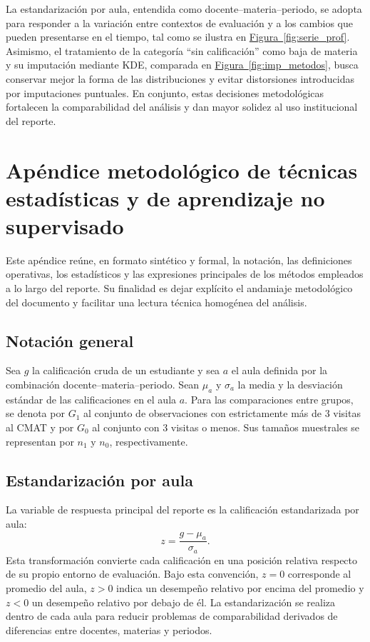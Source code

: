 \documentclass[8pt,a4paper]{article} %
\numberwithin{figure}{subsection}
\begin{document}
La estandarización por aula, entendida como docente--materia--periodo, se adopta para responder a la variación entre contextos de evaluación y a los cambios que pueden presentarse en el tiempo, tal como se ilustra en \hyperref[fig:serie_prof]{Figura~\ref{fig:serie_prof}}. Asimismo, el tratamiento de la categoría ``sin calificación'' como baja de materia y su imputación mediante KDE, comparada en \hyperref[fig:imp_metodos]{Figura~\ref{fig:imp_metodos}}, busca conservar mejor la forma de las distribuciones y evitar distorsiones introducidas por imputaciones puntuales. En conjunto, estas decisiones metodológicas fortalecen la comparabilidad del análisis y dan mayor solidez al uso institucional del reporte.

\appendix
\newpage
\section{Apéndice metodológico de técnicas estadísticas y de aprendizaje no supervisado}

Este apéndice reúne, en formato sintético y formal, la notación, las definiciones operativas, los estadísticos y las expresiones principales de los métodos empleados a lo largo del reporte. Su finalidad es dejar explícito el andamiaje metodológico del documento y facilitar una lectura técnica homogénea del análisis.

\subsection{Notación general}
Sea $g$ la calificación cruda de un estudiante y sea $a$ el aula definida por la combinación docente--materia--periodo. Sean $\mu_a$ y $\sigma_a$ la media y la desviación estándar de las calificaciones en el aula $a$. Para las comparaciones entre grupos, se denota por $G_1$ al conjunto de observaciones con estrictamente más de 3 visitas al CMAT y por $G_0$ al conjunto con 3 visitas o menos. Sus tamaños muestrales se representan por $n_1$ y $n_0$, respectivamente.

\subsection{Estandarización por aula}
La variable de respuesta principal del reporte es la calificación estandarizada por aula:
\[
z=\frac{g-\mu_a}{\sigma_a}.
\]
Esta transformación convierte cada calificación en una posición relativa respecto de su propio entorno de evaluación. Bajo esta convención, $z=0$ corresponde al promedio del aula, $z>0$ indica un desempeño relativo por encima del promedio y $z<0$ un desempeño relativo por debajo de él. La estandarización se realiza dentro de cada aula para reducir problemas de comparabilidad derivados de diferencias entre docentes, materias y periodos.
\end{document}
